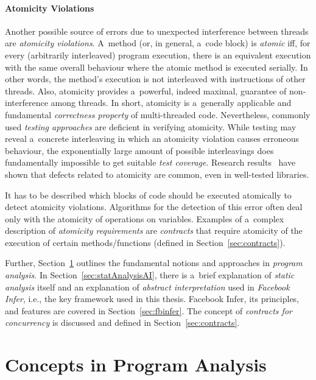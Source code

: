 \paragraph{Atomicity Violations~\cite{atomizer}}
Another possible source of errors due to unexpected interference between threads are \emph{atomicity violations}. A~method (or, in general, a~code block) is \emph{atomic} iff, for every (arbitrarily interleaved) program execution, there is an equivalent execution with the same overall behaviour where the atomic method is executed serially. In other words, the method's execution is not interleaved with instructions of other threads. Also, atomicity provides a~powerful, indeed maximal, guarantee of non-interference among threads. In short, atomicity is a~generally applicable and fundamental \emph{correctness property} of multi-threaded code. Nevertheless, commonly used \emph{testing approaches} are deficient in verifying atomicity. While testing may reveal a~concrete interleaving in which an atomicity violation causes erroneous behaviour, the exponentially large amount of possible interleavings does fundamentally impossible to get suitable \emph{test coverage}. Research results~\cite{contracts2017, atomizer, contracts2015, atomicityOOP} have shown that defects related to atomicity are common, even in well-tested libraries.

It has to be described which blocks of code should be executed atomically to detect atomicity violations. Algorithms for the detection of this error often deal only with the atomicity of operations on variables. Examples of a~complex description of \emph{atomicity requirements} are \emph{contracts} that require atomicity of the execution of certain methods/functions (defined in Section~\ref{sec:contracts}).~\cite{muzikovskaBP}

Further, Section~\ref{sec:programAnalysis} outlines the fundamental notions and approaches in \emph{program analysis}. In Section~\ref{sec:statAnalysisAI}, there is a~brief explanation of \emph{static analysis} itself and an explanation of \emph{abstract interpretation} used in \emph{Facebook Infer}, i.e., the key framework used in this thesis. Facebook Infer, its principles, and features are covered in Section~\ref{sec:fbinfer}. The concept of \emph{contracts for concurrency} is discussed and defined in Section~\ref{sec:contracts}.


\section{Concepts in Program Analysis}
\label{sec:programAnalysis}

